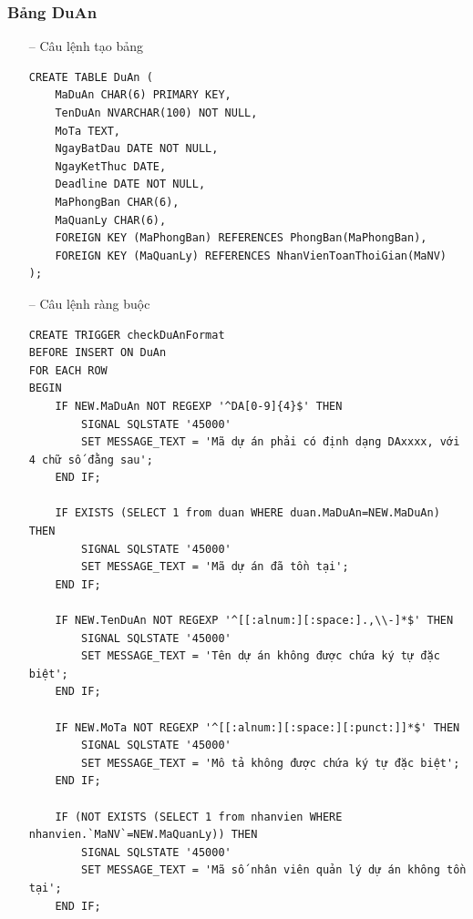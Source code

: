 \subsubsection{Bảng DuAn}
\begin{itemize}
    \item [--] Câu lệnh tạo bảng
   \begin{verbatim}
CREATE TABLE DuAn (
    MaDuAn CHAR(6) PRIMARY KEY,
    TenDuAn NVARCHAR(100) NOT NULL,
    MoTa TEXT,
    NgayBatDau DATE NOT NULL,
    NgayKetThuc DATE,
    Deadline DATE NOT NULL,
    MaPhongBan CHAR(6),
    MaQuanLy CHAR(6),
    FOREIGN KEY (MaPhongBan) REFERENCES PhongBan(MaPhongBan),
    FOREIGN KEY (MaQuanLy) REFERENCES NhanVienToanThoiGian(MaNV)
);
    \end{verbatim}
    \newpage
    \item [--] Câu lệnh ràng buộc
\begin{verbatim}
CREATE TRIGGER checkDuAnFormat 
BEFORE INSERT ON DuAn
FOR EACH ROW
BEGIN
    IF NEW.MaDuAn NOT REGEXP '^DA[0-9]{4}$' THEN
        SIGNAL SQLSTATE '45000' 
        SET MESSAGE_TEXT = 'Mã dự án phải có định dạng DAxxxx, với 4 chữ số đằng sau';
    END IF;

    IF EXISTS (SELECT 1 from duan WHERE duan.MaDuAn=NEW.MaDuAn) THEN
        SIGNAL SQLSTATE '45000'
        SET MESSAGE_TEXT = 'Mã dự án đã tồn tại';
    END IF;

    IF NEW.TenDuAn NOT REGEXP '^[[:alnum:][:space:].,\\-]*$' THEN 
        SIGNAL SQLSTATE '45000'
        SET MESSAGE_TEXT = 'Tên dự án không được chứa ký tự đặc biệt';
    END IF;

    IF NEW.MoTa NOT REGEXP '^[[:alnum:][:space:][:punct:]]*$' THEN 
        SIGNAL SQLSTATE '45000'
        SET MESSAGE_TEXT = 'Mô tả không được chứa ký tự đặc biệt';
    END IF;

    IF (NOT EXISTS (SELECT 1 from nhanvien WHERE nhanvien.`MaNV`=NEW.MaQuanLy)) THEN
        SIGNAL SQLSTATE '45000'
        SET MESSAGE_TEXT = 'Mã số nhân viên quản lý dự án không tồn tại';
    END IF;


\end{verbatim}
\end{itemize}
